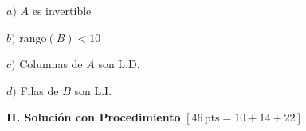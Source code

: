 \documentclass[11pt]{article}
\newcommand{\casillasino}{\fbox{\phantom{XX}}}
\begin{document}
\begin{enumerate}
\vspace{6pt}
\noindent
\begin{minipage}[t]{0.46\linewidth}
$a)$ $A$ es invertible\hfill\casillasino

\vspace{6pt}
$b)$ $\mathrm{rango}(B)<10$\hfill\casillasino
\end{minipage}%
\begin{minipage}[t]{0.5\linewidth}
$c)$ Columnas de $A$ son L.D.\hfill\casillasino

\vspace{6pt}
$d)$ Filas de $B$ son L.I.\hfill\casillasino
\end{minipage}
\end{enumerate}

\vspace{10pt}
\noindent\textbf{\large II. Solución con Procedimiento} $[46\,\mathrm{pts} = 10+14+22]$
\end{document}
